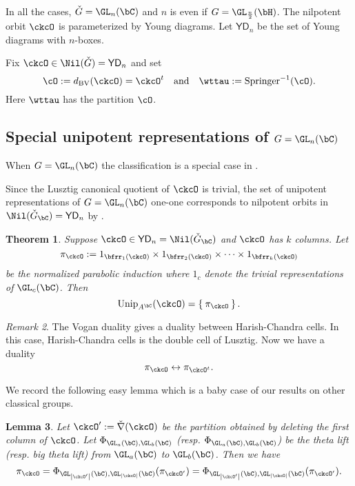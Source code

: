 \documentclass[12pt,a4paper]{amsart}
\def\abs#1{\left|{#1}\right|}
\def\DDD{{\check\nabla}}
\numberwithin{equation}{section}
\newtheorem{thm}{Theorem}[section]
\newtheorem{lem}[thm]{Lemma}
\theoremstyle{remark}
\newtheorem{remark}[thm]{Remark}
\def\half{{\tfrac{1}{2}}}
\def\Unip{\mathrm{Unip}}
\def\ckG{\check{G}}
\def\ckGc{\check{G}_{\bC}}
\def\dBV{d_{\mathrm{BV}}}
\def\YD{\mathsf{YD}}
\def\AND{\quad \text{and} \quad}
\def\Spr{\mathrm{Springer}}
\begin{document}

In all the cases, $\ckG = \GL_{n}(\bC)$ and $n$ is even if
$G = \GL_{\frac{n}{2}}(\bH)$.
The nilpotent orbit $\ckcO$ is parameterized by Young diagrams.
Let $\YD_{n}$ be the set of Young diagrams with $n$-boxes.

Fix $\ckcO\in \Nil(\ckG) = \YD_{n}$ and set
\[
  \cO :=\dBV(\ckcO) = \ckcO^{t} \AND \wttau := \Spr^{-1}(\cO).
\]
Here $\wttau$ has the partition $\cO$.



\subsection{Special unipotent representations of $G = \GL_n(\bC)$}
When $G = \GL_{n}(\bC)$ the classification is a special case in \cite{BVUni}.

Since the Lusztig canonical quotient of $\ckcO$ is trivial, the set of unipotent representations
of $G = \GL_n(\bC)$ one-one corresponds to nilpotent orbits in $\Nil(\ckGc) = \YD_{n}$ by
\cite{BVUni}.

\begin{thm}
Suppose $\ckcO\in \YD_{n} = \Nil(\ckGc)$ and $\ckcO$ has $k$ columns.
Let
\[
 \pi_{\ckcO} := 1_{\bfrr_1(\ckcO)}\times  1_{\bfrr_2(\ckcO)}\times \cdots
 \times 1_{\bfrr_k(\ckcO)}
\]
be the normalized parabolic induction where $1_{c}$ denote the trivial
representations of $\GL_c(\bC)$.
Then
\[
  \Unip_{A^{\bC}}(\ckcO) = \Set{\pi_{\ckcO}}.
\]
\end{thm}


\begin{remark}
The Vogan duality gives a duality between Harish-Chandra cells.
In this case, Harish-Chandra cells is the double cell
of Lusztig.
Now we have a duality
\[
 \pi_\ckcO \leftrightarrow \pi_{\ckcO^t}.
\]
\end{remark}

We record the following easy lemma which is a baby case of our results on other
classical groups.
\begin{lem}
  Let $\ckcO' := \DDD(\ckcO)$ be the partition obtained by deleting the first
  column of $\ckcO$. Let $\Phi_{\GL_{a}(\bC),\GL_{b}(\bC)}$ (resp.
  $\Phi_{\GL_{a}(\bC),\GL_{b}(\bC)}$) be the theta lift (resp. big theta lift)
  from $\GL_a(\bC)$ to $\GL_b(\bC)$. Then we have
  \[
    \pi_{\ckcO} = \Phi_{\GL_{\abs{\ckcO'}}(\bC),\GL_{\abs{\ckcO}}(\bC)} (\pi_{\ckcO'})= \Phi_{\GL_{\abs{\ckcO'}}(\bC),\GL_{\abs{\ckcO}}(\bC)} (\pi_{\ckcO'}).
  \]
\end{lem}
\end{document}
